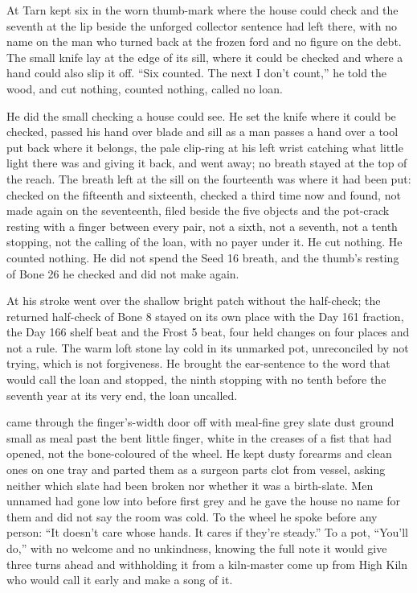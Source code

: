 At  Tarn kept six in the worn thumb-mark where the house could check and the seventh at the lip beside the unforged collector sentence  had left there, with no name on the man who turned back at the frozen ford and no figure on the debt. The small knife lay at the edge of its sill, where it could be checked and where a hand could also slip it off. “Six counted. The next I don't count,” he told the wood, and cut nothing, counted nothing, called no loan.

He did the small checking a house could see. He set the knife where it could be checked, passed his hand over blade and sill as a man passes a hand over a tool put back where it belongs, the pale clip-ring at his left wrist catching what little light there was and giving it back, and went away; no breath stayed at the top of the reach. The breath left at the sill on the fourteenth was where it had been put: checked on the fifteenth and sixteenth, checked a third time now and found, not made again on the seventeenth, filed beside the five objects and the pot-crack resting with a finger between every pair, not a sixth, not a seventh, not a tenth stopping, not the calling of the loan, with no payer under it. He cut nothing. He counted nothing. He did not spend the Seed 16 breath, and the thumb's resting of Bone 26 he checked and did not make again.

At  his stroke went over the shallow bright patch without the half-check; the returned half-check of Bone 8 stayed on its own place with the Day 161 fraction, the Day 166 shelf beat and the Frost 5 beat, four held changes on four places and not a rule. The warm loft stone lay cold in its unmarked pot, unreconciled by not trying, which is not forgiveness. He brought the ear-sentence to the word that would call the loan and stopped, the ninth stopping with no tenth before the seventh year at its very end, the loan uncalled.

 came through the finger's-width door off  with meal-fine grey slate dust ground small as meal past the bent little finger, white in the creases of a fist that had opened, not the bone-coloured  of the wheel. He kept dusty forearms and clean ones on one tray and parted them as a surgeon parts clot from vessel, asking neither which slate had been broken nor whether it was a birth-slate. Men unnamed had gone low into  before first grey and he gave the house no name for them and did not say the room was cold. To the wheel he spoke before any person: “It doesn't care whose hands. It cares if they're steady.” To a pot, “You'll do,” with no welcome and no unkindness, knowing the full note it would give three turns ahead and withholding it from a kiln-master come up from High Kiln who would call it early and make a song of it.

